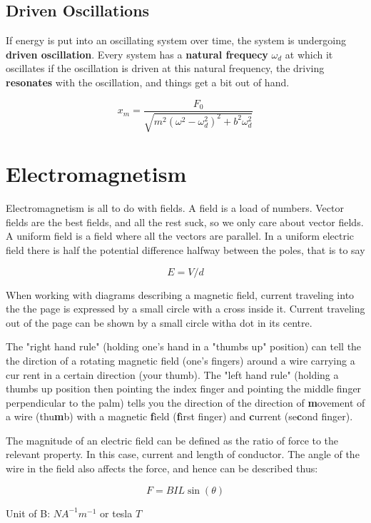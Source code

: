 \documentclass{article}
\begin{document}
\subsection{Driven Oscillations}
If energy is put into an oscillating system over time, the system is undergoing \textbf{driven oscillation}. Every system has a \textbf{natural frequecy} $\omega_d$ at which it oscillates if the oscillation is driven at this natural frequency, the driving \textbf{resonates} with the oscillation, and things get a bit out of hand.

\[x_m=\frac{F_0}{\sqrt{m^2\left(\omega^2-\omega_d^2\right)^2+b^2\omega_d^2}}\]

\section{Electromagnetism}

Electromagnetism is all to do with fields. A field is a load of numbers. Vector fields are the best fields, and all the rest suck, so we only care about vector fields. A uniform field is a field where all the vectors are parallel. In a uniform electric field there is half the potential difference halfway between the poles, that is to say

\[E=V/d\]

\noindent When working with diagrams describing a magnetic field, current traveling into the the page is expressed by a small circle with a cross inside it. Current traveling out of the page can be shown by a small circle witha dot in its centre.

The "right hand rule" (holding one's hand in a "thumbs up" position) can tell the the dirction of a rotating magnetic field (one's fingers) around a wire carrying a cur
rent in a certain direction (your thumb). The "left hand rule" (holding a thumbs up position then pointing the index finger and pointing the middle finger perpendicular to the palm) tells you the direction of the direction of \textbf{m}ovement of a wire (thu\textbf{m}b) with a magnetic \textbf{f}ield (\textbf{f}irst finger) and \textbf{c}urrent (se\textbf{c}ond finger).

The magnitude of an electric field can be defined as the ratio of force to the relevant property. In this case, current and length of conductor. The angle of the wire in the field also affects the force, and hence can be described thus:

\[F=BIL\sin\left(\theta\right)\]

\noindent Unit of B: \(NA^{-1}m^{-1}\) or tesla \(T\)
\end{document}
